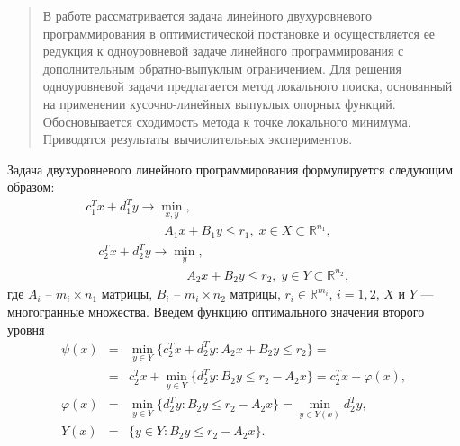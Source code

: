 
\maketitle

\begin{abstract}
В работе рассматривается задача линейного двухуровневого программирования в оптимистической постановке и 
осуществляется ее редукция к одноуровневой задаче линейного программирования с дополнительным обратно-выпуклым ограничением. 
Для решения одноуровневой задачи предлагается метод локального поиска, основанный на применении кусочно-линейных выпуклых опорных функций. 
Обосновывается сходимость метода к точке локального минимума. Приводятся результаты вычислительных экспериментов.

\end{abstract}


Задача двухуровневого линейного программирования формулируется следующим образом:
\begin{gather}
c_1^Tx+d_1^Ty\rightarrow\min_{x,y}, \qquad\qquad\qquad\quad \label{blp1}\\
\qquad\qquad\qquad\: A_1x+B_1y\leqslant r_1,\;x\in X\subset\mathbb{R}^{n_1},\qquad\qquad \label{blp2}\\
\quad c_2^Tx+d_2^Ty\rightarrow\min_y,\qquad\qquad \label{blp3}\\
\qquad\qquad\qquad\qquad A_2x+B_2y\leqslant r_2,\;y\in Y\subset\mathbb{R}^{n_2},\qquad \label{blp4}
\end{gather}
где $A_i$ -- $m_i\times n_1$ матрицы, $B_i$ -- $m_i\times n_2$ матрицы, $r_i\in\mathbb{R}^{m_i}$, $i=1,2$, $X$ и $Y$ --- многогранные множества. 
Введем функцию оптимального значения второго уровня
\begin{eqnarray}
\psi(x)&=&\min_{y\in Y}\{c_2^Tx+d_2^Ty: A_2x+B_2y\leqslant r_2\}=\nonumber\\
&=&c_2^Tx+\min_{y\in Y}\{d_2^Ty: B_2y\leqslant r_2-A_2x\}=c_2^Tx+\varphi(x),\label{blp5}\\
\varphi(x)&=&\min_{y\in Y}\{d_2^Ty: B_2y\leqslant r_2-A_2x\}=\min_{y\in Y(x)}d^T_2y,\label{blp6}\\
Y(x)&=&\{y\in Y: B_2y\leqslant r_2-A_2x\}.\label{blp7}
\end{eqnarray}

